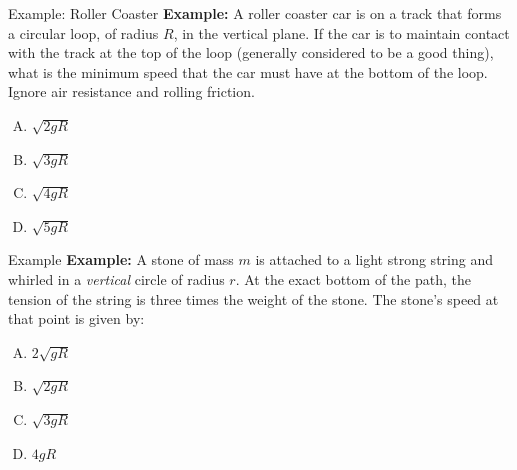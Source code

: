 \documentclass[12pt,compress,aspectratio=169]{beamer}
\begin{document}
\begin{frame}{Example: Roller Coaster}
  \textbf{Example:} A roller coaster car is on a track that forms a circular
  loop, of radius $R$, in the vertical plane. If the car is to maintain contact
  with the track at the top of the loop (generally considered to be a good
  thing), what is the minimum speed that the car must have at the bottom of the
  loop. Ignore air resistance and rolling friction.
  \begin{enumerate}[(A)]
  \item $\sqrt{2gR}$
  \item $\sqrt{3gR}$
  \item $\sqrt{4gR}$
  \item $\sqrt{5gR}$
  \end{enumerate}
\end{frame}



\begin{frame}{Example}
  \textbf{Example:} A stone of mass $m$ is attached to a light strong string
  and whirled in a \emph{vertical} circle of radius $r$. At the exact bottom of
  the path, the tension of the string is three times the weight of the stone.
  The stone's speed at that point is given by:
  \begin{enumerate}[(A)]
  \item $2\sqrt{gR}$
  \item $\sqrt{2gR}$
  \item $\sqrt{3gR}$
  \item $4gR$
  \end{enumerate}
\end{frame}
\end{document}
